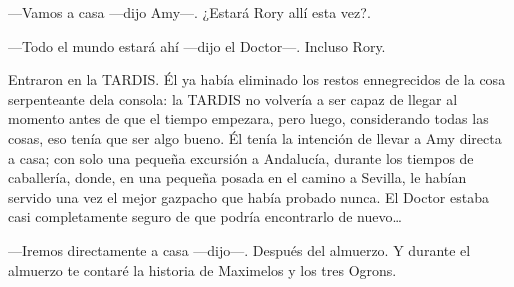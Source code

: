 ---Vamos a casa ---dijo Amy---. ¿Estará Rory allí esta vez?.

---Todo el mundo estará ahí ---dijo el Doctor---. Incluso Rory.

Entraron en la TARDIS. Él ya había eliminado los restos ennegrecidos de la cosa serpenteante dela consola: la TARDIS no volvería a ser capaz de llegar al momento antes de que el tiempo empezara, pero luego, considerando todas las cosas, eso tenía que ser algo bueno. Él tenía la intención de llevar a Amy directa a casa; con solo una pequeña excursión a Andalucía, durante los tiempos de caballería, donde, en una pequeña posada en el camino a Sevilla, le habían servido una vez el mejor gazpacho que había probado nunca. El Doctor estaba casi completamente seguro de que podría encontrarlo de nuevo\ldots{}

---Iremos directamente a casa ---dijo---. Después del almuerzo. Y durante el almuerzo te contaré la historia de Maximelos y los tres Ogrons.

